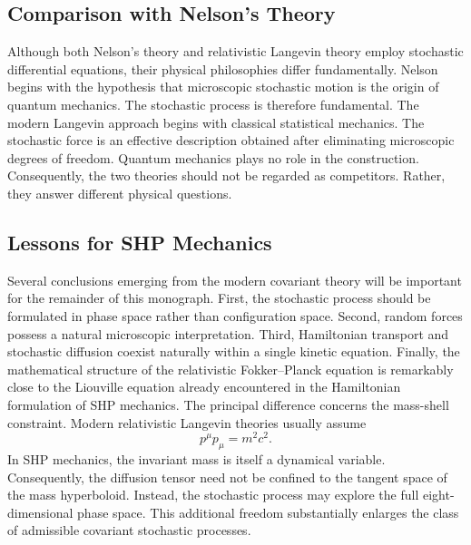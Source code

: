 \subsection{Comparison with Nelson's Theory}
Although both Nelson's theory and relativistic Langevin theory employ
stochastic differential equations, their physical philosophies differ
fundamentally.
Nelson begins with the hypothesis that microscopic stochastic motion is
the origin of quantum mechanics.
The stochastic process is therefore fundamental.
The modern Langevin approach begins with classical statistical
mechanics.
The stochastic force is an effective description obtained after
eliminating microscopic degrees of freedom.
Quantum mechanics plays no role in the construction.
Consequently,
the two theories should not be regarded as competitors.
Rather,
they answer different physical questions.
\subsection{Lessons for SHP Mechanics}
Several conclusions emerging from the modern covariant theory will be
important for the remainder of this monograph.
First,
the stochastic process should be formulated in phase space rather than
configuration space.
Second,
random forces possess a natural microscopic interpretation.
Third,
Hamiltonian transport and stochastic diffusion coexist naturally within
a single kinetic equation.
Finally,
the mathematical structure of the relativistic Fokker--Planck equation
is remarkably close to the Liouville equation already encountered in the
Hamiltonian formulation of SHP mechanics.
The principal difference concerns the mass-shell constraint.
Modern relativistic Langevin theories usually assume
\[p^\mu p_\mu=m^2c^2.\]
In SHP mechanics,
the invariant mass is itself a dynamical variable.
Consequently,
the diffusion tensor need not be confined to the tangent space of the
mass hyperboloid.
Instead,
the stochastic process may explore the full eight-dimensional phase
space.
This additional freedom substantially enlarges the class of admissible
covariant stochastic processes.
